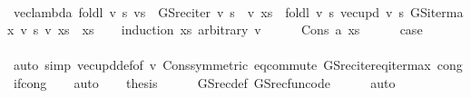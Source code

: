 \begin{isabellebody}
%
\isadelimproof
%
\endisadelimproof
%
\isatagproof
{}\isamarkupfalse%
\ {\isacharminus}{\kern0pt}\isanewline
\ \ \isamarkupfalse%
\ {\isachardoublequoteopen}vec{\isacharunderscore}{\kern0pt}lambda\ {\isacharparenleft}{\kern0pt}foldl\ {\isacharparenleft}{\kern0pt}{\isasymlambda}v\ s{\isachardot}{\kern0pt}\ v{\isacharparenleft}{\kern0pt}s\ {\isacharcolon}{\kern0pt}{\isacharequal}{\kern0pt}\ GS{\isacharunderscore}{\kern0pt}rec{\isacharunderscore}{\kern0pt}iter\ v\ s{\isacharparenright}{\kern0pt}{\isacharparenright}{\kern0pt}\ {\isacharparenleft}{\kern0pt}{\isacharparenleft}{\kern0pt}{\isachardollar}{\kern0pt}{\isacharparenright}{\kern0pt}\ v{\isacharparenright}{\kern0pt}\ xs{\isacharparenright}{\kern0pt}\ {\isacharequal}{\kern0pt}\ foldl\ {\isacharparenleft}{\kern0pt}{\isasymlambda}v\ s{\isachardot}{\kern0pt}\ vec{\isacharunderscore}{\kern0pt}upd\ v\ s\ {\isacharparenleft}{\kern0pt}GS{\isacharunderscore}{\kern0pt}iter{\isacharunderscore}{\kern0pt}max\ v\ s{\isacharparenright}{\kern0pt}{\isacharparenright}{\kern0pt}\ v\ xs{\isachardoublequoteclose}\ \ xs\isanewline
\ \ \isamarkupfalse%
\ {\isacharparenleft}{\kern0pt}induction\ xs\ arbitrary{\isacharcolon}{\kern0pt}\ v{\isacharparenright}{\kern0pt}\isanewline
\ \ \ \ \isamarkupfalse%
\ {\isacharparenleft}{\kern0pt}Cons\ a\ xs{\isacharparenright}{\kern0pt}\isanewline
\ \ \ \ \isamarkupfalse%
\ {\isacharquery}{\kern0pt}case\isanewline
\ \ \ \ \ \ \isamarkupfalse%
\ {\isacharparenleft}{\kern0pt}auto\ simp{\isacharcolon}{\kern0pt}\ vec{\isacharunderscore}{\kern0pt}upd{\isacharunderscore}{\kern0pt}def{\isacharbrackleft}{\kern0pt}of\ v{\isacharbrackright}{\kern0pt}\ Cons{\isacharbrackleft}{\kern0pt}symmetric{\isacharbrackright}{\kern0pt}\ eq{\isacharunderscore}{\kern0pt}commute\ GS{\isacharunderscore}{\kern0pt}rec{\isacharunderscore}{\kern0pt}iter{\isacharunderscore}{\kern0pt}eq{\isacharunderscore}{\kern0pt}iter{\isacharunderscore}{\kern0pt}max\ cong{\isacharcolon}{\kern0pt}\ if{\isacharunderscore}{\kern0pt}cong{\isacharparenright}{\kern0pt}\isanewline
\ \ \isamarkupfalse%
\ auto\isanewline
\ \ \isamarkupfalse%
\ {\isacharquery}{\kern0pt}thesis\isanewline
\ \ \ \ \isamarkupfalse%
\ GS{\isacharunderscore}{\kern0pt}rec{\isacharunderscore}{\kern0pt}def\ GS{\isacharunderscore}{\kern0pt}rec{\isacharunderscore}{\kern0pt}fun{\isacharunderscore}{\kern0pt}code{\isacharprime}{\kern0pt}\isanewline
\ \ \ \ \isamarkupfalse%
\ auto\isanewline
{}\isamarkupfalse%

\end{isabellebody}
